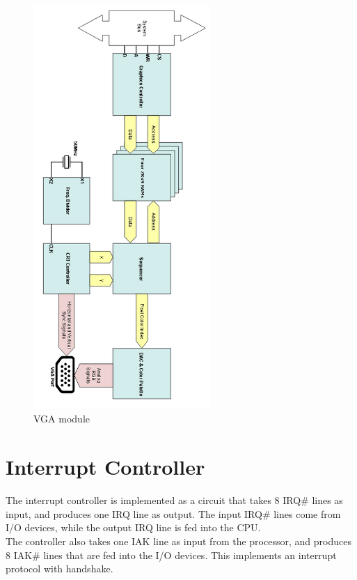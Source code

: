 \documentclass[oneside]{book}
\begin{document}
\begin{figure}[H]
\begin{center}
\includegraphics[width=0.6\textwidth]{vga2.png}
\end{center}
\caption{VGA module}
\label{vga}
\end{figure}

\section {Interrupt Controller}

The interrupt controller is implemented as a circuit that takes
8 IRQ\# lines as input, and produces one IRQ line as output. The input
IRQ\# lines come from I/O devices, while the output IRQ line is fed into
the CPU.\\

The controller also takes one IAK line as input from the processor,
and produces 8 IAK\# lines that are fed into the I/O devices. This
implements an interrupt protocol with handshake.
\end{document}
